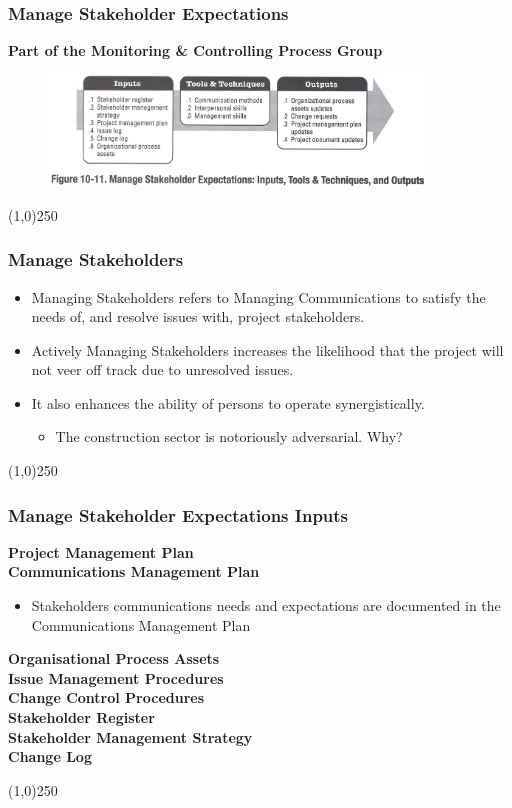 \begin{frame}
\frametitle{Manage Stakeholder Expectations}
\textbf{Part of the Monitoring \& Controlling Process Group}
\begin{figure}
	\centering
		\includegraphics[width = 10cm]{images/Fig10-11.jpg}
	\label{fig:10-11}
\end{figure}
\end{frame}\begin{center}\line(1,0){250}\end{center}

\begin{frame}
\frametitle{Manage Stakeholders}
\begin{itemize}
	\item Managing Stakeholders refers to Managing Communications to satisfy the needs of, and resolve issues with, project stakeholders.
	\item Actively Managing Stakeholders increases the likelihood that the project will not veer off track due to unresolved issues.
	\item It also enhances the ability of persons to operate synergistically.
	\begin{itemize}
		\item The construction sector is notoriously adversarial.  Why?
	\end{itemize}
\end{itemize}
\end{frame}\begin{center}\line(1,0){250}\end{center}



\begin{frame}
\frametitle{Manage Stakeholder Expectations \hfill\hfill Inputs}
\textbf{Project Management Plan}\\
\textbf{Communications Management Plan}\\
\begin{itemize}
	\item Stakeholders communications needs and expectations are documented in the Communications Management Plan
\end{itemize}
\textbf{Organisational Process Assets}\\
\textbf{Issue Management Procedures}\\
\textbf{Change Control Procedures}\\
\textbf{Stakeholder Register}\\
\textbf{Stakeholder Management Strategy}\\
\textbf{Change Log}\\
\end{frame}\begin{center}\line(1,0){250}\end{center}


